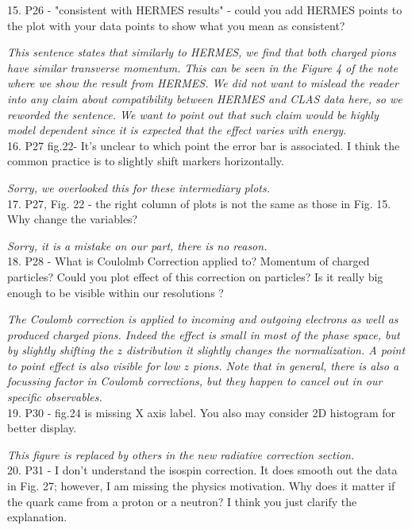 \documentclass[12pt]{article}
\begin{document}
15.
P26 - "consistent with HERMES results" - could you add HERMES points to the plot with 
your data points to show what you mean as consistent?

{\it This sentence states that similarly to HERMES, we find that both charged pions have similar
transverse momentum. This can be seen in the Figure 4 of the note where we show the result from 
HERMES. We did not want to mislead the reader into any claim about compatibility between 
HERMES and CLAS data here, so we reworded the sentence. We want to point out that such claim 
would be highly model dependent since it is expected that the effect varies with energy. } \\


16.
P27 fig.22-
 It's unclear to which point the error bar is associated. I think the common 
practice is to slightly shift markers horizontally.

{\it Sorry, we overlooked this for these intermediary plots.} \\

17.
P27, Fig. 22 - the right column of plots is not the same as those in Fig. 15.  Why change the 
variables?

{\it Sorry, it is a mistake on our part, there is no reason.} \\

18.
P28 - What is Coulolmb Correction applied to? Momentum of charged particles? Could you 
plot effect of this correction on particles? Is it really big enough to be visible within our 
resolutions ?

{\it The Coulomb correction is applied to incoming and outgoing electrons as well as
produced charged pions. Indeed the effect is small in most of the phase space, but 
by slightly shifting the $z$ distribution it slightly changes the normalization. A
point to point effect is also visible for low $z$ pions. Note that in general, there
is also a focussing factor in Coulomb corrections, but they happen to cancel out in
our specific observables.} \\


19.
P30 - 
fig.24 is missing X axis label. You also may consider 2D histogram for better display.

{\it This figure is replaced by others in the new radiative correction section.} \\


20.
P31 - I don’t understand the isospin correction.  It does smooth out the data in Fig. 27; 
however, I am missing the physics motivation.  Why does it matter if the quark came from a 
proton or a neutron?  I think you just clarify the explanation.
\end{document}
